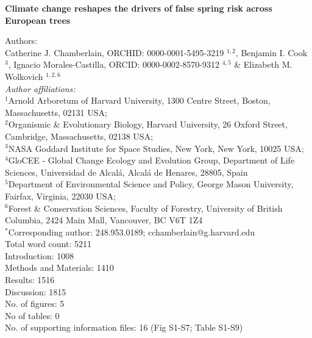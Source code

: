 \documentclass{article}[12pt]
\begin{document}
\noindent 
\textbf{\LARGE{Climate change reshapes the drivers of false spring risk across European trees}} 


\noindent Authors:\\
Catherine J. Chamberlain, ORCHID: 0000-0001-5495-3219 $^{1,2}$, Benjamin I. Cook $^{3}$, Ignacio Morales-Castilla,  ORCID: 0000-0002-8570-9312 $^{4,5}$ \& Elizabeth M. Wolkovich $^{1,2,6}$
\vspace{2ex}\\
\emph{Author affiliations:}\\
$^{1}$Arnold Arboretum of Harvard University, 1300 Centre Street, Boston, Massachusetts, 02131 USA; \\
$^{2}$Organismic \& Evolutionary Biology, Harvard University, 26 Oxford Street, Cambridge, Massachusetts, 02138 USA; \\
$^{3}$NASA Goddard Institute for Space Studies, New York, New York, 10025 USA; \\
$^{4}$GloCEE - Global Change Ecology and Evolution Group, Department of Life Sciences, Universidad de Alcal\'{a}, Alcal\'{a} de Henares, 28805, Spain \\
$^{5}$Department of Environmental Science and Policy, George Mason University, Fairfax, Virginia, 22030 USA; \\
$^{6}$Forest \& Conservation Sciences, Faculty of Forestry, University of British Columbia, 2424 Main Mall, Vancouver, BC V6T 1Z4\\
\vspace{2ex}
$^*$Corresponding author: 248.953.0189; cchamberlain@g.harvard.edu\\

Total word count: 5211 \\
Introduction: 1008 \\
Methods and Materials: 1410\\
Results: 1516\\
Discussion: 1815 \\

No. of figures: 5\\
No of tables: 0 \\
No. of supporting information files: 16 (Fig S1-S7; Table S1-S9)\\ 
\end{document}
